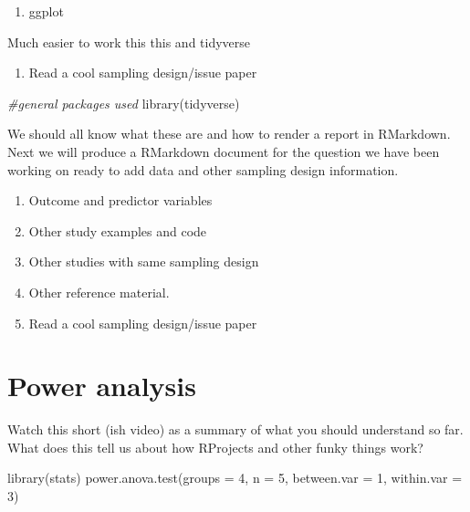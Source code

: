 \documentclass[
]{book}
\newenvironment{Shaded}{\begin{snugshade}}{\end{snugshade}}
\newcommand{\AttributeTok}[1]{\textcolor[rgb]{0.77,0.63,0.00}{#1}}
\newcommand{\CommentTok}[1]{\textcolor[rgb]{0.56,0.35,0.01}{\textit{#1}}}
\newcommand{\DecValTok}[1]{\textcolor[rgb]{0.00,0.00,0.81}{#1}}
\newcommand{\FunctionTok}[1]{\textcolor[rgb]{0.00,0.00,0.00}{#1}}
\newcommand{\NormalTok}[1]{#1}
\providecommand{\tightlist}{%
  \setlength{\itemsep}{0pt}\setlength{\parskip}{0pt}}
\begin{document}
\begin{enumerate}
\def\labelenumi{\arabic{enumi}.}
\setcounter{enumi}{5}
\tightlist
\item
  ggplot
\end{enumerate}

Much easier to work this this and tidyverse

\begin{enumerate}
\def\labelenumi{\arabic{enumi}.}
\setcounter{enumi}{6}
\tightlist
\item
  Read a cool sampling design/issue paper
\end{enumerate}

\begin{Shaded}
\begin{Highlighting}[]
\CommentTok{\#general packages used}
\FunctionTok{library}\NormalTok{(tidyverse)}
\end{Highlighting}
\end{Shaded}

We should all know what these are and how to render a report in RMarkdown. Next we will produce a RMarkdown document for the question we have been working on ready to add data and other sampling design information.

\begin{enumerate}
\def\labelenumi{\arabic{enumi}.}
\tightlist
\item
  Outcome and predictor variables
\item
  Other study examples and code
\item
  Other studies with same sampling design
\item
  Other reference material.
\item
  Read a cool sampling design/issue paper
\end{enumerate}

\hypertarget{power-analysis}{%
\chapter{Power analysis}\label{power-analysis}}

Watch this short (ish video) as a summary of what you should understand so far.
What does this tell us about how RProjects and other funky things work?

\begin{Shaded}
\begin{Highlighting}[]
\FunctionTok{library}\NormalTok{(stats)}
\FunctionTok{power.anova.test}\NormalTok{(}\AttributeTok{groups =} \DecValTok{4}\NormalTok{, }\AttributeTok{n =} \DecValTok{5}\NormalTok{, }\AttributeTok{between.var =} \DecValTok{1}\NormalTok{, }\AttributeTok{within.var =} \DecValTok{3}\NormalTok{)}
\end{Highlighting}
\end{Shaded}
\end{document}

